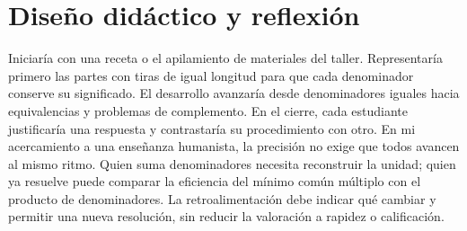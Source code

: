 \documentclass[spanish,letterpaper,oneside]{article}
\begin{document}
\section{Diseño didáctico y reflexión}
Iniciaría con una receta o el apilamiento de materiales del taller. Representaría primero las partes con tiras de igual longitud para que cada denominador conserve su significado. El desarrollo avanzaría desde denominadores iguales hacia equivalencias y problemas de complemento. En el cierre, cada estudiante justificaría una respuesta y contrastaría su procedimiento con otro.
En mi acercamiento a una enseñanza humanista, la precisión no exige que todos avancen al mismo ritmo. Quien suma denominadores necesita reconstruir la unidad; quien ya resuelve puede comparar la eficiencia del mínimo común múltiplo con el producto de denominadores. La retroalimentación debe indicar qué cambiar y permitir una nueva resolución, sin reducir la valoración a rapidez o calificación.
\end{document}
